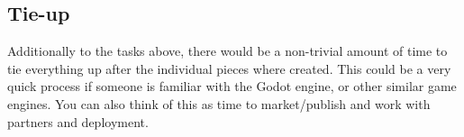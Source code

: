 \documentclass{article}
\begin{document}
\subsection{Tie-up}

Additionally to the tasks above, there would be a non-trivial amount
of time to tie everything up after the individual pieces where
created. This could be a very quick process if someone is familiar
with the Godot engine, or other similar game engines. You can also
think of this as time to market/publish and work with partners and deployment.
\end{document}
